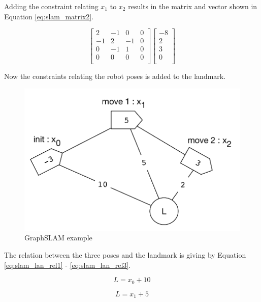 Adding the constraint relating $x_1$ to $x_2$ results in the matrix and vector shown in Equation \ref{eq:slam_matrix2}.

\begin{equation}
\label{eq:slam_matrix2}
\begin{bmatrix}
2 & -1 & 0 & 0 \\
-1 & 2 & -1 & 0 \\
0 & -1 & 1 & 0 \\
0 & 0 & 0 & 0 \\
\end{bmatrix}
\begin{bmatrix}
-8 \\
2 \\
3 \\
0 \\
\end{bmatrix}
\end{equation}

Now the constraints relating the robot poses is added to the landmark.

\begin{figure}[H]
\centering
\includegraphics[scale=0.70]{images/ex_slam_graph}
\caption{GraphSLAM example}
\label{fig:slam_ex}
\end{figure}

The relation between the three poses and the landmark is giving by Equation \ref{eq:slam_lan_rel1} - \ref{eq:slam_lan_rel3}.

\begin{equation}
\label{eq:slam_lan_rel1}
L = x_0 + 10
\end{equation}

\begin{equation}
\label{eq:slam_lan_rel2}
L = x_1 + 5
\end{equation}

